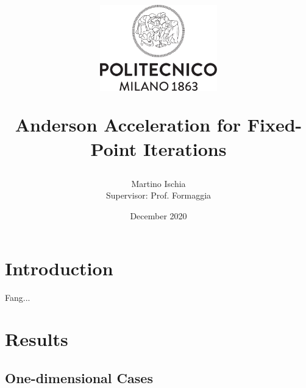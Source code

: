 \documentclass[12pt]{article}
\title{
\vspace{-30mm}\begin{figure}[h]
\centering
\includegraphics[width=2in]{logo_polimi.png}
\end{figure}Anderson Acceleration for Fixed-Point Iterations}
\author{Martino Ischia\\ \footnotesize{Supervisor: Prof. Formaggia}}
\date{December 2020}
\begin{document}
\maketitle

\tableofcontents

\section{Introduction}
	Fang... \cite{Fang}

\section{Results}
\subsection{One-dimensional Cases}

\printbibliography[heading=bibintoc,
title={Bibliography}]
\end{document}
